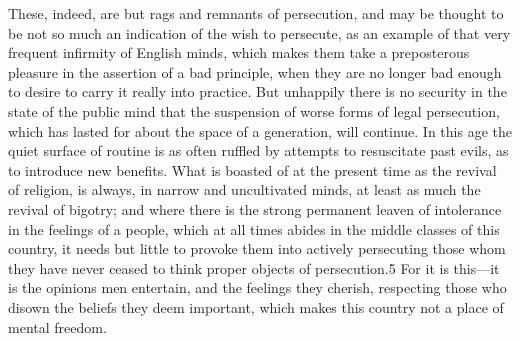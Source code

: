 \documentclass[11pt,openany]{book}
\begin{document}
These, indeed, are but rags and remnants of persecution, and may be thought to be not so much an indication of the wish to persecute, as an example of that very frequent infirmity of English minds, which makes them take a preposterous pleasure in the assertion of a bad principle, when they are no longer bad enough to desire to carry it really into practice. But unhappily there is no security in the state of the public mind that the suspension of worse forms of legal persecution, which has lasted for about the space of a generation, will continue. In this age the quiet surface of routine is as often ruffled by attempts to resuscitate past evils, as to introduce new benefits. What is boasted of at the present time as the revival of religion, is always, in narrow and uncultivated minds, at least as much the revival of bigotry; and where there is the strong permanent leaven of intolerance in the feelings of a people, which at all times abides in the middle classes of this country, it needs but little to provoke them into actively persecuting those whom they have never ceased to think proper objects of persecution.5 For it is this---it is the opinions men entertain, and the feelings they cherish, respecting those who disown the beliefs they deem important, which makes this country not a place of mental freedom.
\end{document}
